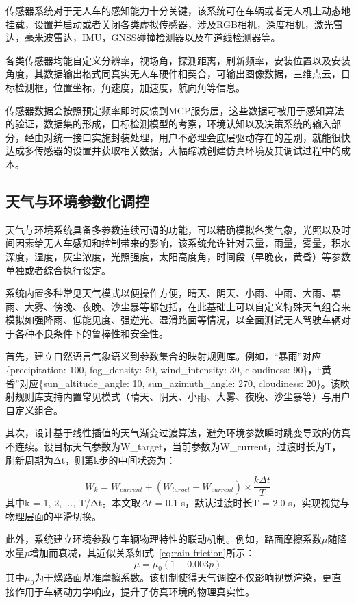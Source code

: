 传感器系统对于无人车的感知能力十分关键，该系统可在车辆或者无人机上动态地挂载，设置并启动或者关闭各类虚拟传感器，涉及RGB相机，深度相机，激光雷达，毫米波雷达，IMU，GNSS碰撞检测器以及车道线检测器等。

各类传感器均能自定义分辨率，视场角，探测距离，刷新频率，安装位置以及安装角度，其数据输出格式同真实无人车硬件相契合，可输出图像数据，三维点云，目标检测框，位置坐标，角速度，加速度，航向角等信息。

传感器数据会按照预定频率即时反馈到MCP服务层，这些数据可被用于感知算法的验证，数据集的形成，目标检测模型的考察，环境认知以及决策系统的输入部分，经由对统一接口实施封装处理，用户不必理会底层驱动存在的差别，就能很快达成多传感器的设置并获取相关数据，大幅缩减创建仿真环境及其调试过程中的成本。

\subsection{天气与环境参数化调控}

天气与环境系统具备多参数连续可调的功能，可以精确模拟各类气象，光照以及时间因素给无人车感知和控制带来的影响，该系统允许针对云量，雨量，雾量，积水深度，湿度，灰尘浓度，光照强度，太阳高度角，时间段（早晚夜，黄昏）等参数单独或者综合执行设定。

系统内置多种常见天气模式以便操作方便，晴天、阴天、小雨、中雨、大雨、暴雨、大雾、傍晚、夜晚、沙尘暴等都包括，在此基础上可以自定义特殊天气组合来模拟如强降雨、低能见度、强逆光、湿滑路面等情况，以全面测试无人驾驶车辆对于各种不良条件下的鲁棒性和安全性。

首先，建立自然语言气象语义到参数集合的映射规则库。例如，``暴雨''对应\{precipitation:
100, fog\_density: 50, wind\_intensity: 30, cloudiness:
90\}，``黄昏''对应\{sun\_altitude\_angle: 10, sun\_azimuth\_angle: 270,
cloudiness:
20\}。该映射规则库支持内置常见模式（晴天、阴天、小雨、大雾、夜晚、沙尘暴等）与用户自定义组合。

其次，设计基于线性插值的天气渐变过渡算法，避免环境参数瞬时跳变导致的仿真不连续。设目标天气参数为W\_target，当前参数为W\_current，过渡时长为T，刷新周期为Δt，则第k步的中间状态为：

\begin{equation}
W_k=W_{current}+(W_{target}-W_{current})\times\frac{k\Delta t}{T}
\label{eq:weather-transition}
\end{equation}
其中k = 1, 2, ..., T/Δt。本文取$\Delta t$ = 0.1 s，默认过渡时长T = 2.0
s，实现视觉与物理层面的平滑切换。

此外，系统建立环境参数与车辆物理特性的联动机制。例如，路面摩擦系数$\mu$随降水量$p$增加而衰减，其近似关系如式~\eqref{eq:rain-friction}所示：
\begin{equation}
\mu=\mu_0(1-0.003p)
\label{eq:rain-friction}
\end{equation}
其中$\mu_0$为干燥路面基准摩擦系数。该机制使得天气调控不仅影响视觉渲染，更直接作用于车辆动力学响应，提升了仿真环境的物理真实性。


